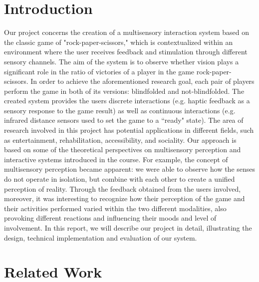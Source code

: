 \documentclass[11pt]{report}
\begin{document}
\section*{Introduction}
Our project concerns the creation of a multisensory interaction system based on the classic game of "rock-paper-scissors," which is contextualized within an environment where the user receives feedback and stimulation through different sensory channels. The aim of the system is to observe whether vision plays a significant role in the ratio of victories of a player in the game rock-paper-scissors. In order to achieve the aforementioned research goal, each pair of players perform the game in both of its versions: blindfolded and not-blindfolded. 
The created system provides the users discrete interactions (e.g. haptic feedback as a sensory response to the game result) as well as continuous interactions (e.g. infrared distance sensors used to set the game to a “ready" state).
The area of research involved in this project has potential applications in different fields, such as entertainment, rehabilitation, accessibility, and sociality.
Our approach is based on some of the theoretical perspectives on multisensory perception and interactive systems introduced in the course.
For example, the concept of multisensory perception became apparent: we were able to observe how the senses do not operate in isolation, but combine with each other to create a unified perception of reality.
Through the feedback obtained from the users involved, moreover, it was interesting to recognize how their perception of the game and their activities performed varied within the two different modalities, also provoking different reactions and influencing their moods and level of involvement.
In this report, we will describe our project in detail, illustrating the design, technical implementation and evaluation of our system.

\section*{Related Work}

\end{document}
